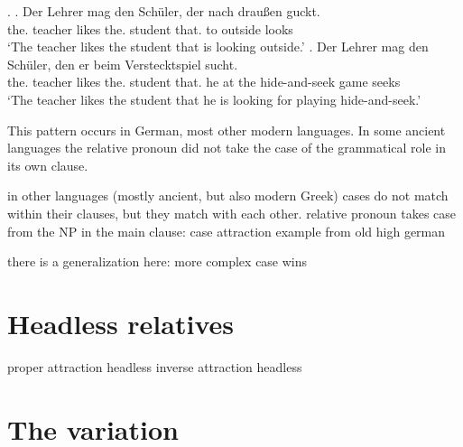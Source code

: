\ex.\label{ex:germanrelatives}
\ag. Der Lehrer mag den Schüler, der nach draußen guckt.\\
 the. teacher likes the. student that. to outside looks\\
 `The teacher likes the student that is looking outside.'\label{ex:germanrelative1}
 \bg. Der Lehrer mag den Schüler, den er beim Verstecktspiel sucht.\\
 the. teacher likes the. student that. he {at the} {hide-and-seek game} seeks\\
 `The teacher likes the student that he is looking for playing hide-and-seek.'\label{ex:germanrelative2}

This pattern occurs in German, most other modern languages. In some ancient languages the relative pronoun did not take the case of the grammatical role in its own clause.

in other languages (mostly ancient, but also modern Greek) cases do not match within their clauses, but they match with each other.
relative pronoun takes case from the NP in the main clause: case attraction
example from old high german

there is a generalization here: more complex case wins


\section{Headless relatives}

proper attraction headless
inverse attraction headless



\section{The variation}
